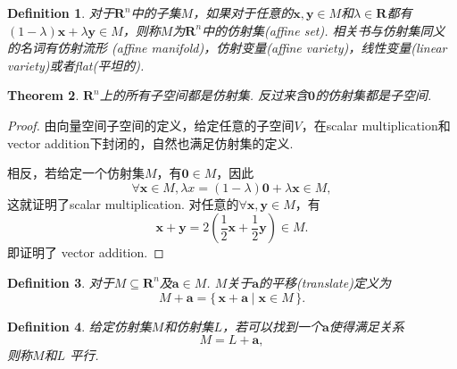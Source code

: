 \documentclass{article}
\newtheorem{theorem}{Theorem}[section]
\newtheorem{definition}[theorem]{Definition}
\newcommand\Set[2]{\{\,#1\mid#2\,\}} %
\newcommand{\vect}[1]{\mathbf{#1}} %
\newcommand{\thereal}{\mathbf{R}} %
\begin{document}
\begin{definition}
\rm 对于$\thereal^n$中的子集$M$，如果对于任意的$\vect{x},\vect{y} \in M$和$\lambda \in \thereal$都有$(1-\lambda)\vect{x} + \lambda\vect{y} \in M$，则称$M$为$\thereal^n$中的{\color{red}仿射集}(affine set). 相关书与仿射集同义的名词有{\color{red}仿射流形
}(affine manifold)，{\color{red}仿射变量}(affine variety)，{\color{red}线性变量}(linear variety)或者{\color{red}flat}(平坦的).
\end{definition}

\begin{theorem}
\rm $\thereal^n$上的所有子空间都是仿射集. 反过来含$\vect{0}$的仿射集都是子空间.
\end{theorem}

\begin{proof}
\rm 由向量空间子空间的定义，给定任意的子空间$V$，在{\color{red}scalar multiplication}和{\color{red} vector addition}下封闭的，自然也满足仿射集的定义. 

相反，若给定一个仿射集$M$，有$\vect{0} \in M$，因此
$$
\forall \vect{x} \in M, \lambda x = (1-\lambda)\vect{0} + \lambda \vect{x} \in M,
$$
这就证明了{\color{red}scalar multiplication}. 对任意的$\forall \vect{x},\vect{y} \in M$，有
$$
\vect{x}+\vect{y} = 2(\frac{1}{2} \vect{x} + \frac{1}{2} \vect{y}) \in M.
$$
即证明了{\color{red} vector addition}.
\end{proof}

\begin{definition}
\rm 对于$M \subseteq \thereal^n$及$\vect{a} \in M$. $M$关于$\vect{a}$的{\color{red}平移}(translate)定义为
$$
M + \vect{a} = \Set{\vect{x}+\vect{a}}{\vect{x} \in M}.
$$
\end{definition}

\begin{definition}
\rm 给定仿射集$M$和仿射集$L$，若可以找到一个$\vect{a}$使得满足关系
$$
M = L + \vect{a},
$$
则称$M$和$L$ {\color{red}平行}.
\end{definition}
\end{document}
